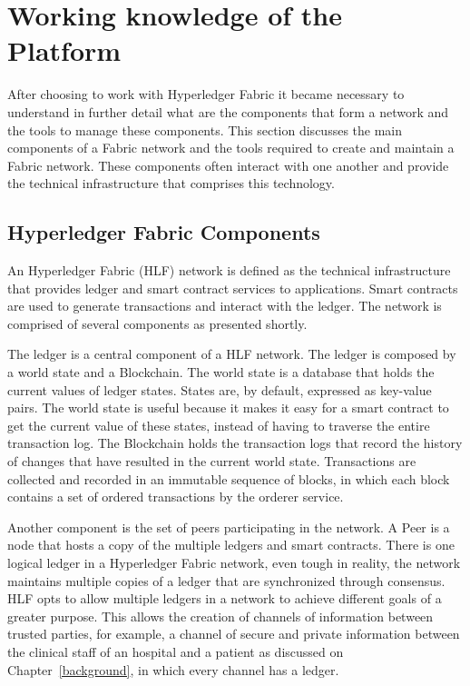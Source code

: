 \section{Working knowledge of the Platform}

After choosing to work with Hyperledger Fabric it became necessary to
understand in further detail what are the components that form a network and
the tools to manage these components. This section discusses the main
components of a Fabric network and the tools required to create and maintain a
Fabric network. These components often interact with one another and provide
the technical infrastructure that comprises this technology.

\subsection{Hyperledger Fabric Components}

An Hyperledger Fabric (HLF) network is defined as the technical infrastructure
that provides ledger and smart contract services to applications. Smart
contracts are used to generate transactions and interact with the ledger. The
network is comprised of several components as presented shortly.

The ledger is a central component of a HLF network. The ledger is composed by a
world state and a Blockchain. The world state is a database that holds the
current values of ledger states. States are, by default, expressed as key-value
pairs. The world state is useful because it makes it easy for a smart contract
to get the current value of these states, instead of having to traverse the
entire transaction log. The Blockchain holds the transaction logs that record
the history of changes that have resulted in the current world state.
Transactions are collected and recorded in an immutable sequence of blocks, in
which each block contains a set of ordered transactions by the orderer service.

Another component is the set of peers participating in the network. A Peer is a
node that hosts a copy of the multiple ledgers and smart contracts. There is
one logical ledger in a Hyperledger Fabric network, even tough in reality, the
network maintains multiple copies of a ledger that are synchronized through
consensus. HLF opts to allow multiple ledgers in a network to achieve different
goals of a greater purpose. This allows the creation of channels of information
between trusted parties, for example, a channel of secure and private
information between the clinical staff of an hospital and a patient as
discussed on Chapter~\ref{background}, in which every channel has a ledger.

